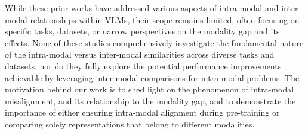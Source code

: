 While these prior works have addressed various aspects of intra-modal and inter-modal relationships within VLMs, their scope remains limited, often focusing on specific tasks, datasets, or narrow perspectives on the modality gap and its effects. None of these studies comprehensively investigate the fundamental nature of the intra-modal versus inter-modal similarities across diverse tasks and datasets, nor do they fully explore the potential performance improvements achievable by leveraging inter-modal comparisons for intra-modal problems. The motivation behind our work is to shed light on the phenomenon of intra-modal misalignment, and its relationship to the modality gap, and to demonstrate the importance of either ensuring intra-modal alignment during pre-training or comparing solely representations that belong to different modalities.